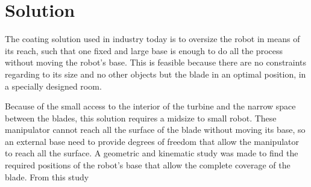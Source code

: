 \section{Solution}


\begin{comment}
A solução de revestimento de uma pá de turbina \textit{in situ} requer um robô
de pequeno a médio porte, capaz de passar pelo limitado acesso da turbina. 
No entanto, a pá da turbina é uma peça com uma grande área a ser coberta e
nenhum manipulador comercial que atenda ao requisitos citados é capaz de
alcançar, de uma só posição, toda a sua extensão.
Assim, é necessário prover ao robô liberdade de posicionamento para realizar o
revestimento em pequenas regiões da pá, por posição de base.

Devido ao peso do manipulador e por questões de segurança, a sua movimentação no
interior da turbina não pode ser uma tarefa manual. Logo, uma base mecânica deve
ser capaz de levar o robô desde a escotilha até a posição ideal para o
revestimento, de forma segura e precisa. O dimensionamento desta base deve levar
em consideração todos os esforços de operação, como: o peso do sistema; as
cargas dinâmicas de movimentação do robô e o empuxo da pistola.

Foram estudados diversos conceitos para os graus de liberdade providos pela
base mecânica. O estudo destes conceitos estão detalhados no EMMA-DETAIL.
\end{comment}

The coating solution used in industry today is to oversize the robot
in means of its reach, such that one fixed and large base is enough to do all 
the process without moving the robot's base. 
This is feasible because there are no constraints regarding to its size and no
other objects but the blade in an optimal position, in a specially designed room.

Because of the small access to the interior of the turbine and the narrow space
between the blades, this solution requires a midsize to small robot. 
These manipulator cannot reach all the surface of the blade without moving its
base, so an external base need to provide degrees of freedom that allow the
manipulator to reach all the surface.
A geometric and kinematic study was made to find the required positions of the
robot's base that allow the complete coverage of the blade.
From this study 



